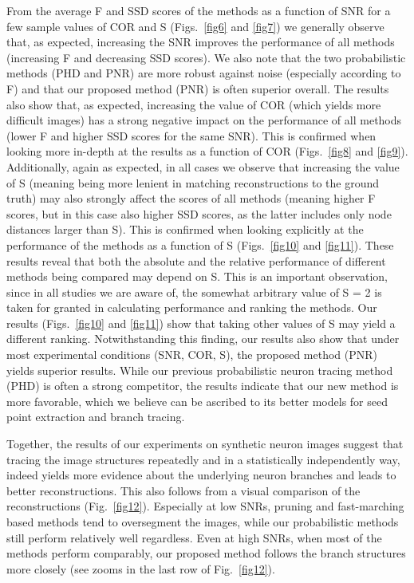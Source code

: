 From the average F and SSD scores of the methods as a function of SNR for a few sample values of COR and S (Figs.~\ref{fig6} and \ref{fig7}) we generally observe that, as expected, increasing the SNR improves the performance of all methods (increasing F and decreasing SSD scores). We also note that the two probabilistic methods (PHD and PNR) are more robust against noise (especially according to F) and that our proposed method (PNR) is often superior overall. The results also show that, as expected, increasing the value of COR (which yields more difficult images) has a strong negative impact on the performance of all methods (lower F and higher SSD scores for the same SNR). This is confirmed when looking more in-depth at the results as a function of COR (Figs.~\ref{fig8} and \ref{fig9}). Additionally, again as expected, in all cases we observe that increasing the value of S (meaning being more lenient in matching reconstructions to the ground truth) may also strongly affect the scores of all methods (meaning higher F scores, but in this case also higher SSD scores, as the latter includes only node distances larger than S). This is confirmed when looking explicitly at the performance of the methods as a function of S (Figs.~\ref{fig10} and \ref{fig11}). These results reveal that both the absolute and the relative performance of different methods being compared may depend on S. This is an important observation, since in all studies we are aware of, the somewhat arbitrary value of S = 2 is taken for granted in calculating performance and ranking the methods. Our results (Figs.~\ref{fig10} and \ref{fig11}) show that taking other values of S may yield a different ranking. Notwithstanding this finding, our results also show that under most experimental conditions (SNR, COR, S), the proposed method (PNR) yields superior results. While our previous probabilistic neuron tracing method (PHD) \cite{radojevic2017automated} is often a strong competitor, the results indicate that our new method is more favorable, which we believe can be ascribed to its better models for seed point extraction and branch tracing.

Together, the results of our experiments on synthetic neuron images suggest that tracing the image structures repeatedly and in a statistically independently way, indeed yields more evidence about the underlying neuron branches and leads to better reconstructions. This also follows from a visual comparison of the reconstructions (Fig.~\ref{fig12}). Especially at low SNRs, pruning and fast-marching based methods tend to oversegment the images, while our probabilistic methods still perform relatively well regardless. Even at high SNRs, when most of the methods perform comparably, our proposed method follows the branch structures more closely (see zooms in the last row of Fig.~\ref{fig12}).

